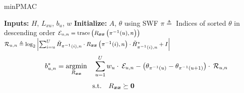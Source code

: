 \begin{algorithm}[t]
	\caption{minPMAC} 
    \State \textbf{Inputs:} $H$, $L_{xu}$, $b_u$, $w$ 
    \vspace{0.1cm}
    \State \textbf{Initialize:} $A$, $\theta$ using SWF
    \vspace{0.1cm}
    \State $\pi \triangleq$ Indices of sorted $\theta$ in descending order
    \vspace{0.1cm}
        \vspace{0.1cm}
                \vspace{0.1cm}
                \State \hspace{-0.3cm} $\footnotesize \mathcal{E}_{u,n} = \operatorname{trace}\left(R_{\boldsymbol{x} \boldsymbol{x}}\left(\pi^{-1}(u), n\right)\right)$
                \vspace{0.1cm}
                \State \hspace{-0.3cm} $\footnotesize \mathcal{R}_{u,n} \triangleq  \log _2\left|\sum_{i=u}^U \tilde{H}_{\pi^{-1}(i), n} \cdot R_{\boldsymbol{x} \boldsymbol{x}}\left(\pi^{-1}(i), n\right) \cdot \tilde{H}_{\pi^{-1}(i), n}^*+I\right|$
            \EndFor 
            \vspace{-0.7cm}
            \State \begin{equation*}
            \hspace{0.7cm} b_{u,n}^*=\underset{{R_{\boldsymbol{xx}}}}{\operatorname{argmin}} \quad \sum_{u=1}^U w_{u} \cdot \: \mathcal{E}_{u,n}- \left(\theta_{\pi^{-1}(u)}-\theta_{\pi^{-1}(u+1)}\right) \cdot \: \mathcal{R}_{u,n} \end{equation*}
            \vspace{-0.6cm}
            \State \begin{equation*}
                \hspace{-1.6cm} \textrm{s.t.} \quad R_{\boldsymbol{xx}}  \succeq \mathbf{0}
            \end{equation*}

\end{algorithm}
